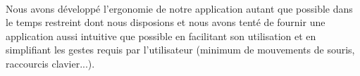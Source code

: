 \paragraph{}
Nous avons développé l'ergonomie de notre application autant que possible dans le temps restreint dont nous disposions et nous avons tenté de fournir une application aussi intuitive que possible en facilitant son utilisation et en simplifiant les gestes requis par l'utilisateur (minimum de mouvements de souris, raccourcis clavier...).
